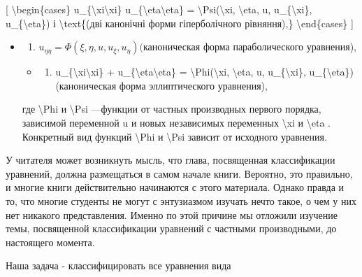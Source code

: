 \documentclass[
]{article}
\providecommand{\tightlist}{%
  \setlength{\itemsep}{0pt}\setlength{\parskip}{0pt}}
\begin{document}
{[} \textbackslash begin\{cases\}
u\_\{\textbackslash xi\textbackslash xi\}
u\_\{\textbackslash eta\textbackslash eta\} =
\textbackslash Psi(\textbackslash xi, \textbackslash eta, u,
u\_\{\textbackslash xi\}, u\_\{\textbackslash eta\}) і
\textbackslash text\{(дві канонічні форми гіперболічного рівняння),\}
\textbackslash end\{cases\} {]}

\begin{itemize}
\item
  \begin{enumerate}
  \def\labelenumi{\arabic{enumi}.}
  \setcounter{enumi}{1}
  \tightlist
  \item
    \(u_{\eta\eta} = \Phi(\xi, \eta, u, u_{\xi}, u_{\eta}) (\)каноническая
    форма параболического уравнения),
  \end{enumerate}

  \begin{itemize}
  \tightlist
  \item
    \begin{enumerate}
    \def\labelenumi{\arabic{enumi}.}
    \setcounter{enumi}{2}
    \tightlist
    \item
      u\_\{\textbackslash xi\textbackslash xi\} +
      u\_\{\textbackslash eta\textbackslash eta\} =
      \textbackslash Phi(\textbackslash xi, \textbackslash eta, u,
      u\_\{\textbackslash xi\}, u\_\{\textbackslash eta\}) (каноническая
      форма эллиптического уравнения),
    \end{enumerate}
  \end{itemize}

  где \textbackslash Phi и \textbackslash Psi ---функции от частных
  производных первого порядка, зависимой переменной u и новых
  независимых переменных \textbackslash xi и \textbackslash eta .
  Конкретный вид функций \textbackslash Phi и \textbackslash Psi зависит
  от исходного уравнения.
\end{itemize}

У читателя может возникнуть мысль, что глава, посвященная классификации
уравнений, должна размещаться в самом начале книги. Вероятно, это
правильно, и многие книги действительно начинаются с этого материала.
Однако правда и то, что многие студенты не могут с энтузиазмом изучать
нечто такое, о чем у них нет никакого представления. Именно по этой
причине мы отложили изучение темы, посвященной классификации уравнений с
частными производными, до настоящего момента.

Наша задача - классифицировать все уравнения вида
\end{document}
